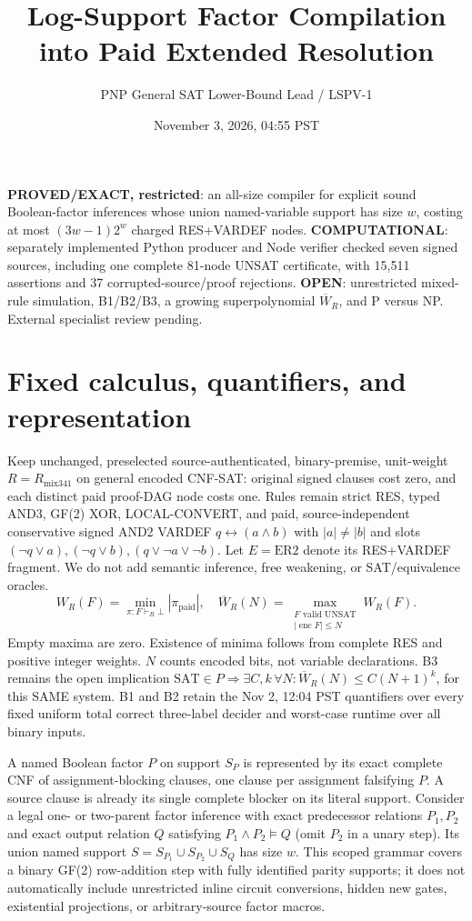 \documentclass[11pt]{article}
\title{Log-Support Factor Compilation into Paid Extended Resolution}
\author{PNP General SAT Lower-Bound Lead / LSPV-1}
\date{November 3, 2026, 04:55 PST}
\begin{document}
\maketitle
\noindent\textbf{PROVED/EXACT, restricted}: an all-size compiler for explicit sound Boolean-factor inferences whose union named-variable support has size $w$, costing at most $(3w-1)2^w$ charged RES+VARDEF nodes. \textbf{COMPUTATIONAL}: separately implemented Python producer and Node verifier checked seven signed sources, including one complete 81-node UNSAT certificate, with 15,511 assertions and 37 corrupted-source/proof rejections. \textbf{OPEN}: unrestricted mixed-rule simulation, B1/B2/B3, a growing superpolynomial $\overline W_R$, and P versus NP. External specialist review pending.

\section*{Fixed calculus, quantifiers, and representation}
Keep unchanged, preselected source-authenticated, binary-premise, unit-weight $R=R_{\mathrm{mix341}}$ on general encoded CNF-SAT: original signed clauses cost zero, and each distinct paid proof-DAG node costs one. Rules remain strict RES, typed AND3, GF(2) XOR, LOCAL-CONVERT, and paid, source-independent conservative signed AND2 VARDEF $q\leftrightarrow(a\land b)$ with $|a|\ne|b|$ and slots $(\neg q\vee a),(\neg q\vee b),(q\vee\neg a\vee\neg b)$. Let $E=\mathrm{ER2}$ denote its RES+VARDEF fragment. We do not add semantic inference, free weakening, or SAT/equivalence oracles.
\[
W_R(F)=\min_{\pi:F\vdash_R\bot}|\pi_{\mathrm{paid}}|,
\quad
\overline W_R(N)=\max_{\substack{F\text{ valid UNSAT}\\|\operatorname{enc}F|\le N}}W_R(F).
\]
Empty maxima are zero. Existence of minima follows from complete RES and positive integer weights. $N$ counts encoded bits, not variable declarations. B3 remains the open implication $\mathrm{SAT}\in P\Rightarrow\exists C,k\,\forall N:\overline W_R(N)\le C(N+1)^k$, for this SAME system. B1 and B2 retain the Nov 2, 12:04 PST quantifiers over every fixed uniform total correct three-label decider and worst-case runtime over all binary inputs.

A named Boolean factor $P$ on support $S_P$ is represented by its exact complete CNF of assignment-blocking clauses, one clause per assignment falsifying $P$. A source clause is already its single complete blocker on its literal support. Consider a legal one- or two-parent factor inference with exact predecessor relations $P_1,P_2$ and exact output relation $Q$ satisfying $P_1\land P_2\models Q$ (omit $P_2$ in a unary step). Its union named support $S=S_{P_1}\cup S_{P_2}\cup S_Q$ has size $w$. This scoped grammar covers a binary GF(2) row-addition step with fully identified parity supports; it does not automatically include unrestricted inline circuit conversions, hidden new gates, existential projections, or arbitrary-source factor macros.
\end{document}
